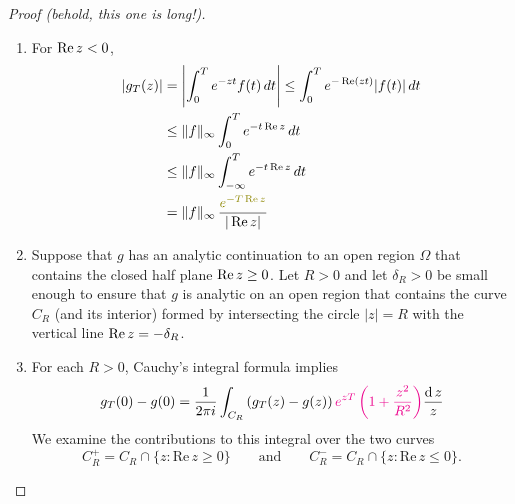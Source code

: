 \documentclass[12pt]{article}
\renewcommand{\d}{\ensuremath{\operatorname{d}}}
\begin{document}
\begin{proof}[Proof (behold, this one is long!)]
\begin{enumerate}[align=left, label=\textit{Step \arabic*:}]
    \item For $\operatorname{Re} z<0$, \begin{equation}\label{nt-eq5}
        \begin{aligned}
            |g_{T}(z)|&=\left|\int_{0}^{T}e^{-zt}f(t)\,dt\right|\leq\int_{0}^{T}e^{-\re (zt)}|f(t)|\,dt\\
            &\leq\|f\|_{\infty}\int_{0}^{T}e^{-t\re z}\,dt\\
            &\leq\|f\|_{\infty}\int_{-\infty}^{T}e^{-t\re z}\,dt\\
            &=\|f\|_{\infty}\,\frac{\gt{e^{-T\re z}}}{|\re z|}
        \end{aligned}
    \end{equation}
    
    \item Suppose that $g$ has an analytic continuation to an open region $\Omega$ that contains the closed half plane $\operatorname{Re} z\geq0$. Let $R>0$ and let $\delta_{R}>0$ be small enough to ensure that $g$ is analytic on an open region that contains the curve $C_{R}$ (and its interior) formed by intersecting the circle $|z|=R$ with the vertical line $\operatorname{Re} z=-\delta_{R}$.

    \item For each $R>0$, Cauchy's integral formula implies \begin{equation}\label{nt-eq6}
        g_{T}(0)-g(0)={\frac{1}{2\pi i}}\int_{C_{R}}\left(g_{T}(z)-g(z)\right)\rt{e^{z T}\left(1+{\frac{z^{2}}{R^{2}}}\right)}{\frac{\d z}{z}}
    \end{equation}
    We examine the contributions to this integral over the two curves
    $$C_{R}^{+}=C_{R}\cap\{z:\mathrm{Re}\,z\geq0\}\qquad\text{and}\qquad C_{R}^{-}=C_{R}\cap\{z:\mathrm{Re}\,z\leq0\}.$$


\end{enumerate}
\end{proof}
\end{document}
